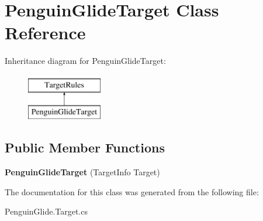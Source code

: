 \hypertarget{class_penguin_glide_target}{}\section{Penguin\+Glide\+Target Class Reference}
\label{class_penguin_glide_target}
Inheritance diagram for Penguin\+Glide\+Target\+:\begin{figure}[H]
\begin{center}
\leavevmode
\includegraphics[height=2.000000cm]{class_penguin_glide_target}
\end{center}
\end{figure}
\subsection*{Public Member Functions}
\begin{DoxyCompactItemize}
\item 
\mbox{\label{class_penguin_glide_target_a037c66701c2e7c967893d9d4322ff4c2}} 
{\bfseries Penguin\+Glide\+Target} (Target\+Info Target)
\end{DoxyCompactItemize}


The documentation for this class was generated from the following file\+:\begin{DoxyCompactItemize}
\item 
Penguin\+Glide.\+Target.\+cs\end{DoxyCompactItemize}
